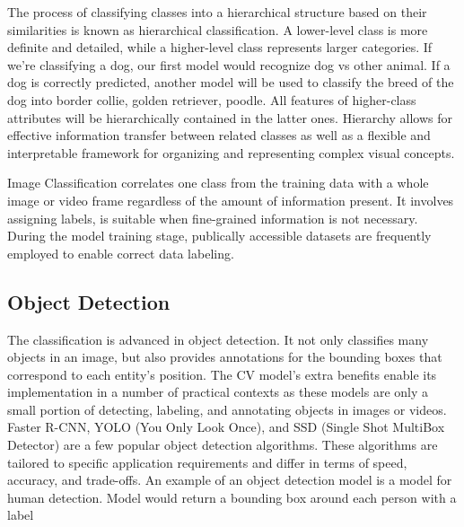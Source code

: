 	The process of classifying classes into a hierarchical structure based on their similarities is known as hierarchical classification. A lower-level class is more definite and detailed, while a higher-level class represents larger categories. If we're classifying a dog, our first model would recognize dog vs other animal. If a dog is correctly predicted, another model will be used to classify the breed of the dog into border collie, golden retriever, poodle. All features of higher-class attributes will be hierarchically contained in the latter ones. Hierarchy allows for effective information transfer between related classes as well as a flexible and interpretable framework for organizing and representing complex visual concepts.
	

Image Classification correlates one class from the training data with a whole image or video frame regardless of the amount of information present. It involves assigning labels, is suitable when fine-grained information is not necessary. During the model training stage, publically accessible datasets are frequently employed to enable correct data labeling.
\subsection*{Object Detection}
	The classification is advanced in object detection. It not only classifies many objects in an image, but also provides annotations for the bounding boxes that correspond to each entity's position. The CV model's extra benefits enable its implementation in a number of practical contexts as these models are only a small portion of detecting, labeling, and annotating objects in images or videos. Faster R-CNN, YOLO (You Only Look Once), and SSD (Single Shot MultiBox Detector) are a few popular object detection algorithms. These algorithms are tailored to specific application requirements and differ in terms of speed, accuracy, and trade-offs.  An example of an object detection model is a model for human detection. Model would return a bounding box around each person with a label
	
